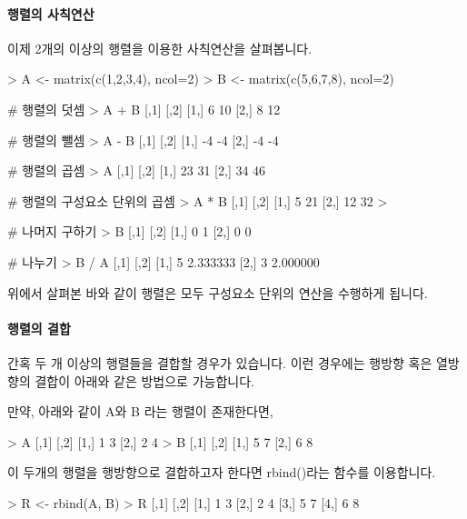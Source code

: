 \documentclass[tutorial.tex]{subfiles}
\begin{document}
\paragraph{행렬의 사칙연산} 이제 2개의 이상의 행렬을 이용한 사칙연산을 살펴봅니다.

\begin{Schunk}
\begin{Soutput}
> A <- matrix(c(1,2,3,4), ncol=2)
> B <- matrix(c(5,6,7,8), ncol=2)

# 행렬의 덧셈
> A + B 
     [,1] [,2]
[1,]    6   10
[2,]    8   12

# 행렬의 뺄셈
> A - B
     [,1] [,2]
[1,]   -4   -4
[2,]   -4   -4

# 행렬의 곱셈  
> A %*% B 
     [,1] [,2]
[1,]   23   31
[2,]   34   46

# 행렬의 구성요소 단위의 곱셈 
> A * B
     [,1] [,2]
[1,]    5   21
[2,]   12   32
> 

# 나머지 구하기
> B %% A
     [,1] [,2]
[1,]    0    1
[2,]    0    0

# 나누기 
> B / A
     [,1]     [,2]
[1,]    5 2.333333
[2,]    3 2.000000
 
\end{Soutput}
\end{Schunk}

위에서 살펴본 바와 같이 행렬은 모두 구성요소 단위의 연산을 수행하게 됩니다. 

\paragraph{행렬의 결합}  간혹 두 개 이상의 행렬들을 결합할 경우가 있습니다.
이런 경우에는 행방향 혹은 열방향의 결합이 아래와 같은 방법으로 가능합니다.

만약, 아래와 같이 A와 B 라는 행렬이 존재한다면, 

\begin{Schunk}
\begin{Soutput}
> A
     [,1] [,2]
[1,]    1    3
[2,]    2    4
> B
     [,1] [,2]
[1,]    5    7
[2,]    6    8
\end{Soutput}
\end{Schunk}

이 두개의 행렬을 행방향으로 결합하고자 한다면 rbind()라는 함수를 이용합니다.

\begin{Schunk}
\begin{Soutput}
> R <- rbind(A, B)
> R
     [,1] [,2]
[1,]    1    3
[2,]    2    4
[3,]    5    7
[4,]    6    8
\end{Soutput}
\end{Schunk}
\end{document}
